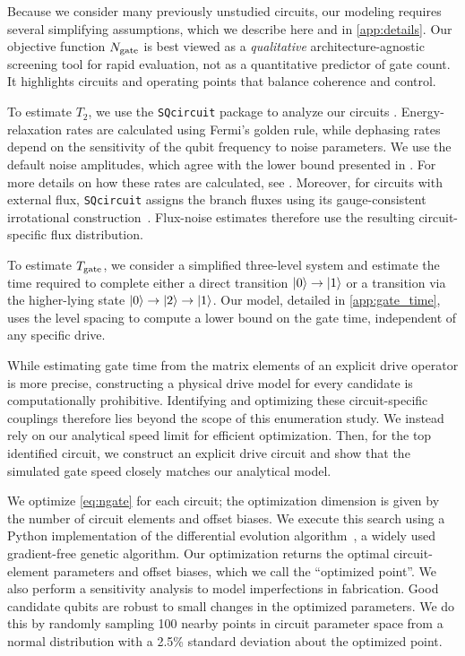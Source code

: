 Because we consider many previously unstudied circuits, our modeling requires several simplifying assumptions, which we describe here and in \cref{app:details}. Our objective function $N_{\rm gate}$ is best viewed as a {\em qualitative} architecture-agnostic screening tool for rapid evaluation, not as a quantitative predictor of gate count. It highlights circuits and operating points that balance coherence and control.


To estimate $T_2$, we use the \verb|SQcircuit| package to analyze our circuits \cite{rajabzadehAnalysisArbitrarySuperconducting2023, rajabzadehGeneralFrameworkGradientBased2024}. Energy-relaxation rates are calculated using Fermi's golden rule, while dephasing rates depend on the sensitivity of the qubit frequency to noise parameters. We use the default noise amplitudes, which agree with the lower bound presented in \cite{houck_life_2009}. For more details on how these rates are calculated, see \cite{rajabzadehAnalysisArbitrarySuperconducting2023, rajabzadehGeneralFrameworkGradientBased2024}. Moreover, for circuits with external flux, \texttt{SQcircuit} assigns the branch fluxes using its gauge-consistent irrotational construction~\cite{YouKoch2019,BryonExtFlux2023,rajabzadehAnalysisArbitrarySuperconducting2023}. Flux-noise estimates therefore use the resulting circuit-specific flux distribution.



To estimate $T_{\rm gate}$, we consider a simplified three-level system and estimate the time required to complete either a direct transition $\ket{0} \rightarrow \ket{1}$ or a transition via the higher-lying state $\ket{0} \rightarrow \ket{2} \rightarrow \ket{1}$. Our model, detailed in \cref{app:gate_time}, uses the level spacing to compute a lower bound on the gate time, independent of any specific drive.

While estimating gate time from the matrix elements of an explicit drive operator is more precise, constructing a physical drive model for every candidate is computationally prohibitive. Identifying and optimizing these circuit-specific couplings therefore lies beyond the scope of this enumeration study. We instead rely on our analytical speed limit for efficient optimization. Then, for the top identified circuit, we construct an explicit drive circuit and show that the simulated gate speed closely matches our analytical model.


We optimize \cref{eq:ngate} for each circuit; the optimization dimension is given by the number of circuit elements and offset biases.
We execute this search using a Python implementation of the differential evolution algorithm~\cite{price_benchmarking_2005}, a widely used gradient-free genetic algorithm. Our optimization returns the optimal circuit-element parameters and offset biases, which we call the ``optimized point''.
We also perform a sensitivity analysis to model imperfections in fabrication. Good candidate qubits are robust to small changes in the optimized parameters. We do this by randomly sampling 100 nearby points in circuit parameter space from a normal distribution with a 2.5\% standard deviation about the optimized point.


